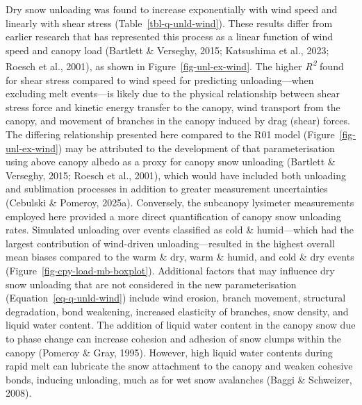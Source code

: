 \documentclass[
]{agujournal2019}
\begin{document}
Dry snow unloading was found to increase exponentially with wind speed
and linearly with shear stress (Table~\ref{tbl-q-unld-wind}). These
results differ from earlier research that has represented this process
as a linear function of wind speed and canopy load (Bartlett \&
Verseghy, 2015; Katsushima et al., 2023; Roesch et al., 2001), as shown
in Figure~\ref{fig-unl-ex-wind}. The higher \emph{R\textsuperscript{2}}
found for shear stress compared to wind speed for predicting
unloading---when excluding melt events---is likely due to the physical
relationship between shear stress force and kinetic energy transfer to
the canopy, wind transport from the canopy, and movement of branches in
the canopy induced by drag (shear) forces. The differing relationship
presented here compared to the R01 model (Figure~\ref{fig-unl-ex-wind})
may be attributed to the development of that parameterisation using
above canopy albedo as a proxy for canopy snow unloading (Bartlett \&
Verseghy, 2015; Roesch et al., 2001), which would have included both
unloading and sublimation processes in addition to greater measurement
uncertainties (Cebulski \& Pomeroy, 2025a). Conversely, the subcanopy
lysimeter measurements employed here provided a more direct
quantification of canopy snow unloading rates. Simulated unloading over
events classified as cold \& humid---which had the largest contribution
of wind-driven unloading---resulted in the highest overall mean biases
compared to the warm \& dry, warm \& humid, and cold \& dry events
(Figure~\ref{fig-cpy-load-mb-boxplot}). Additional factors that may
influence dry snow unloading that are not considered in the new
parameterisation (Equation~\ref{eq-q-unld-wind}) include wind erosion,
branch movement, structural degradation, bond weakening, increased
elasticity of branches, snow density, and liquid water content. The
addition of liquid water content in the canopy snow due to phase change
can increase cohesion and adhesion of snow clumps within the canopy
(Pomeroy \& Gray, 1995). However, high liquid water contents during
rapid melt can lubricate the snow attachment to the canopy and weaken
cohesive bonds, inducing unloading, much as for wet snow avalanches
(Baggi \& Schweizer, 2008).
\end{document}

